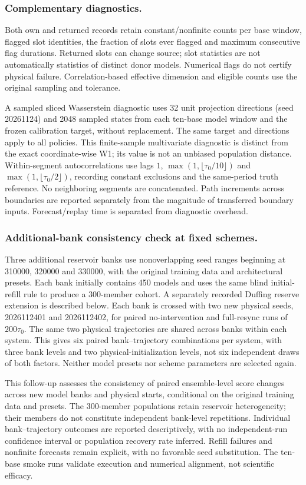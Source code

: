 \documentclass[gmd,manuscript]{copernicus}
\begin{document}
\subsubsection{Complementary diagnostics.}
Both own and returned records retain constant/nonfinite counts per base window, flagged slot identities, the fraction of slots ever flagged and maximum consecutive flag durations. Returned slots can change source; slot statistics are not automatically statistics of distinct donor models. Numerical flags do not certify physical failure. Correlation-based effective dimension and eligible counts use the original sampling and tolerance.

A sampled sliced Wasserstein diagnostic uses 32 unit projection directions (seed 20261124) and 2048 sampled states from each ten-base model window and the frozen calibration target, without replacement. The same target and directions apply to all policies. This finite-sample multivariate diagnostic is distinct from the exact coordinate-wise W1; its value is not an unbiased population distance. Within-segment autocorrelations use lags $1$, $\max(1,\lfloor\tau_0/10\rfloor)$ and $\max(1,\lfloor\tau_0/2\rfloor)$, recording constant exclusions and the same-period truth reference. No neighboring segments are concatenated. Path increments across boundaries are reported separately from the magnitude of transferred boundary inputs. Forecast/replay time is separated from diagnostic overhead.

\subsubsection{Additional-bank consistency check at fixed schemes.}
Three additional reservoir banks use nonoverlapping seed ranges beginning at 310000, 320000 and 330000, with the original training data and architectural presets. Each bank initially contains 450 models and uses the same blind initial-refill rule to produce a 300-member cohort. A separately recorded Duffing reserve extension is described below. Each bank is crossed with two new physical seeds, 2026112401 and 2026112402, for paired no-intervention and full-resync runs of $200\tau_0$. The same two physical trajectories are shared across banks within each system. This gives six paired bank--trajectory combinations per system, with three bank levels and two physical-initialization levels, not six independent draws of both factors. Neither model presets nor scheme parameters are selected again.

This follow-up assesses the consistency of paired ensemble-level score changes across new model banks and physical starts, conditional on the original training data and presets. The 300-member populations retain reservoir heterogeneity; their members do not constitute independent bank-level repetitions. Individual bank--trajectory outcomes are reported descriptively, with no independent-run confidence interval or population recovery rate inferred. Refill failures and nonfinite forecasts remain explicit, with no favorable seed substitution. The ten-base smoke runs validate execution and numerical alignment, not scientific efficacy.
\end{document}

